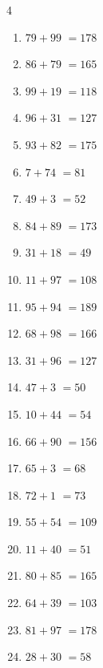 \begin{multicols}{4}
\begin{enumerate}
  \item $79+99$
        $=178$

  \item $86+79$
        $=165$

  \item $99+19$
        $=118$

  \item $96+31$
        $=127$

  \item $93+82$
        $=175$

  \item $7+74$
        $=81$

  \item $49+3$
        $=52$

  \item $84+89$
        $=173$

  \item $31+18$
        $=49$

  \item $11+97$
        $=108$

  \item $95+94$
        $=189$

  \item $68+98$
        $=166$

  \item $31+96$
        $=127$

  \item $47+3$
        $=50$

  \item $10+44$
        $=54$

  \item $66+90$
        $=156$

  \item $65+3$
        $=68$

  \item $72+1$
        $=73$

  \item $55+54$
        $=109$

  \item $11+40$
        $=51$

  \item $80+85$
        $=165$

  \item $64+39$
        $=103$

  \item $81+97$
        $=178$

  \item $28+30$
        $=58$


\end{enumerate}
\end{multicols}

